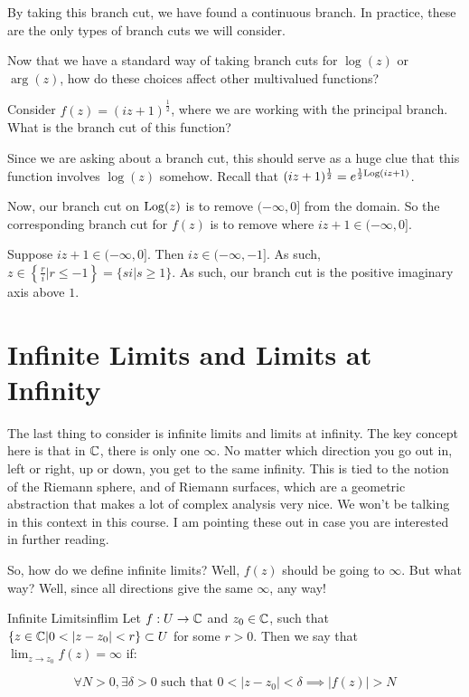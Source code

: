 \noin By taking this branch cut, we have found a continuous branch. In practice, these are the only types of branch cuts we will consider.

Now that we have a standard way of taking branch cuts for $\log(z)$ or $\arg(z)$, how do these choices affect other multivalued functions?

\begin{ex}{}{} Consider $f(z) = (iz + 1)^{\frac{1}{2}}$, where we are working with the principal branch. What is the branch cut of this function?

Since we are asking about a branch cut, this should serve as a huge clue that this function involves $\log(z)$ somehow. Recall that $(iz+1)^{\frac{1}{2}} = e^{\frac{1}{2}\mathrm{Log}(iz+1)}$.

Now, our branch cut on $\mathrm{Log}(z)$ is to remove $(-\infty,0]$ from the domain. So the corresponding branch cut for $f(z)$ is to remove where $iz + 1 \in (-\infty,0]$.

Suppose $iz + 1 \in (-\infty,0]$. Then $iz \in (-\infty,-1]$. As such, $z\in \left\{\frac{r}{i}|r \le -1\right\} = \{si|s\ge 1\}$. As such, our branch cut is the positive imaginary axis above $1$.
\end{ex}

\section{Infinite Limits and Limits at Infinity}

The last thing to consider is infinite limits and limits at infinity. The key concept here is that in $\mathbb{C}$, there is only one $\infty$. No matter which direction you go out in, left or right, up or down, you get to the same infinity. This is tied to the notion of the Riemann sphere, and of Riemann surfaces, which are a geometric abstraction that makes a lot of complex analysis very nice. We won't be talking in this context in this course. I am pointing these out in case you are interested in further reading.

So, how do we define infinite limits? Well, $f(z)$ should be going to $\infty$. But what way? Well, since all directions give the same $\infty$, any way!

\begin{defbo}{Infinite Limits}{inflim}
Let $f:U\rightarrow \mathbb{C}$ and $z_0\in \mathbb{C}$, such that $\{z\in \C| 0 <|z-z_0|< r\} \subset U$ for some $r>0$. Then we say that $\lim_{z\rightarrow z_0} f(z) = \infty$ if:

$$\forall N > 0, \exists \delta > 0 \text{ such that } 0 < |z-z_0| < \delta \implies |f(z)| > N$$
\end{defbo}

